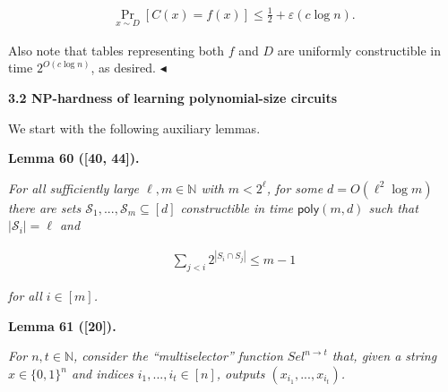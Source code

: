 \[\begin{gathered}
\Pr_{x\sim D}[C(x)=f(x)]\leq\frac{1}{2}+\varepsilon(c\log n).
\end{gathered}\]


Also note that tables representing both $f$ and $D$ are uniformly constructible in time $2^{O(c\log n)}$, as desired.
$\blacktriangleleft$\par







\par\medskip\noindent\textbf{
3.2 NP-hardness of learning polynomial-size circuits}\par




We start with the following auxiliary lemmas.\par





\par\medskip\noindent\textbf{
\textbf{Lemma 60}\textbf{ }([40, 44])\textbf{.}
}\par



\emph{For all sufficiently large $\ell,m\in\mathbb{N}$ with $m<2^{\ell}$, for some $d=O(\ell^{2}\log m)$ there are sets $\mathcal{S}_{1},...,\mathcal{S}_{m}\subseteq[d]$ constructible in time ${\mathsf{poly}}(m,d)$ such that $|\mathcal{S}_{i}|=\ell$ and}\par


\[\begin{gathered}
\sum_{j<i}2^{|S_{i}\cap S_{j}|}\leq m-1
\end{gathered}\]


\emph{for all $i\in[m]$.}\par







\par\medskip\noindent\textbf{
\textbf{Lemma 61}\textbf{ }([20])\textbf{.}
}\par



\emph{For $n,t\in\mathbb{N}$, consider the “multiselector” function $Sel^{n\to t}$ that, given a string $x\in\{0,1\}^{n}$ and indices $i_{1},...,i_{t}\in[n]$, outputs $(x_{i_{1}},...,x_{i_{t}})$.}\par




